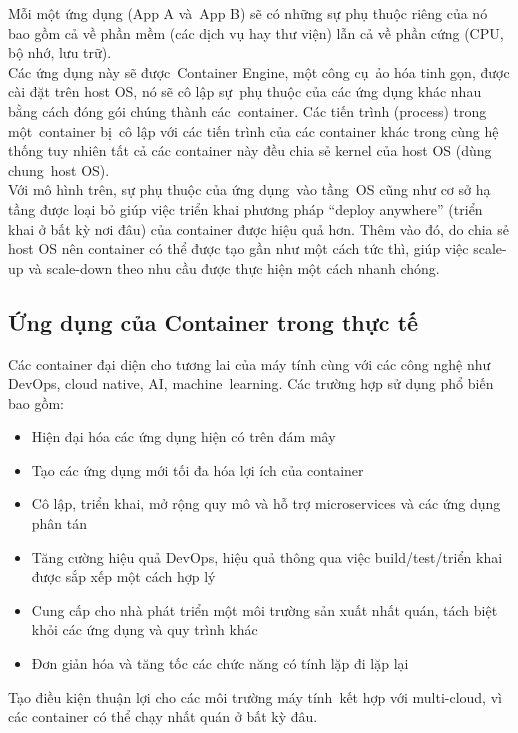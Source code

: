 \documentclass[12pt,a4paper]{report}
\begin{document}
		Mỗi một ứng dụng (App A và App B) sẽ có những sự phụ thuộc riêng của nó bao gồm cả về phần mềm (các dịch vụ hay thư viện) lẫn cả về phần cứng (CPU, bộ nhớ, lưu trữ).\\
		
		Các ứng dụng này sẽ được Container Engine, một công cụ ảo hóa tinh gọn, được cài đặt trên host OS, nó sẽ cô lập sự phụ thuộc của các ứng dụng khác nhau bằng cách đóng gói chúng thành các container. Các tiến trình (process) trong một container bị cô lập với các tiến trình của các container khác trong cùng hệ thống tuy nhiên tất cả các container này đều chia sẻ kernel của host OS (dùng chung host OS).\\
		
		Với mô hình trên, sự phụ thuộc của ứng dụng vào tầng OS cũng như cơ sở hạ tầng được loại bỏ giúp việc triển khai phương pháp “deploy anywhere” (triển khai ở bất kỳ nơi đâu) của container được hiệu quả hơn. Thêm vào đó, do chia sẻ host OS nên container có thể được tạo gần như một cách tức thì, giúp việc scale-up và scale-down theo nhu cầu được thực hiện một cách nhanh chóng.
		\subsection{Ứng dụng của Container trong thực tế}
		\hspace{0.6cm}Các container đại diện cho tương lai của máy tính cùng với các công nghệ như DevOps, cloud native, AI, machine learning. Các trường hợp sử dụng phổ biến bao gồm:
		\begin{itemize}
		\item Hiện đại hóa các ứng dụng hiện có trên đám mây
		\item Tạo các ứng dụng mới tối đa hóa lợi ích của container
		\item Cô lập, triển khai, mở rộng quy mô và hỗ trợ microservices và các ứng dụng phân tán
		\item Tăng cường hiệu quả DevOps, hiệu quả thông qua việc build/test/triển khai được sắp xếp một cách hợp lý
		\item Cung cấp cho nhà phát triển một môi trường sản xuất nhất quán, tách biệt khỏi các ứng dụng và quy trình khác
		\item Đơn giản hóa và tăng tốc các chức năng có tính lặp đi lặp lại\\
		\end{itemize}
		
		Tạo điều kiện thuận lợi cho các môi trường máy tính kết hợp với multi-cloud, vì các container có thể chạy nhất quán ở bất kỳ đâu.
\end{document}
